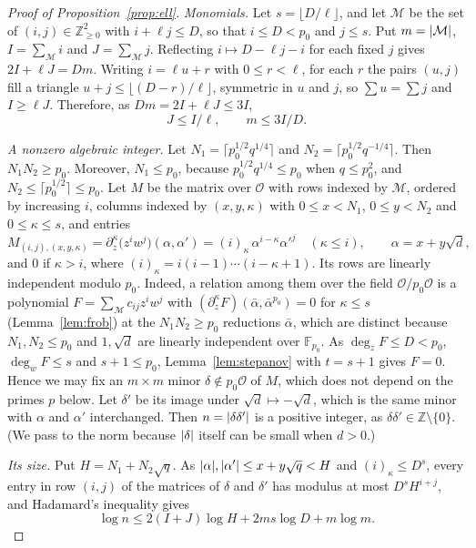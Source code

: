 \documentclass[11pt]{amsart}
\theoremstyle{remark}
\newcommand{\Z}{\mathbb{Z}}
\newcommand{\F}{\mathbb{F}}
\newcommand{\cO}{\mathcal{O}}
\newcommand{\cM}{\mathcal{M}}
\newcommand{\sd}{\sqrt{d}}
\DeclarePairedDelimiter\abs{\lvert}{\rvert}
\begin{document}
\begin{proof}[Proof of Proposition~\ref{prop:ell}]

\emph{Monomials.} Let $s=\lfloor D/\ell\rfloor$, and let $\cM$ be the set of $(i,j)\in\Z_{\ge0}^2$
with $i+\ell j\le D$, so that $i\le D<p_0$ and $j\le s$. Put $m=\abs{\cM}$, $I=\sum_\cM i$ and
$J=\sum_\cM j$. Reflecting $i\mapsto D-\ell j-i$ for each fixed $j$ gives $2I+\ell J=Dm$. Writing
$i=\ell u+r$ with $0\le r<\ell$, for each $r$ the pairs $(u,j)$ fill a triangle
$u+j\le\lfloor(D-r)/\ell\rfloor$, symmetric in $u$ and $j$, so $\sum u=\sum j$ and $I\ge\ell J$. Therefore, as
$Dm=2I+\ell J\le3I$,
\begin{equation}\label{eq:counts}
J\le I/\ell,\qquad m\le3I/D.
\end{equation}

\emph{A nonzero algebraic integer.} Let $N_1=\lceil p_0^{1/2}q^{1/4}\rceil$ and
$N_2=\lceil p_0^{1/2}q^{-1/4}\rceil$. Then $N_1N_2\ge p_0$. Moreover, $N_1\le p_0$, because
$p_0^{1/2}q^{1/4}\le p_0$ when $q\le p_0^2$, and $N_2\le\lceil p_0^{1/2}\rceil\le p_0$. Let $M$
be the matrix over $\cO$ with rows indexed by $\cM$, ordered by increasing $i$, columns indexed by
$(x,y,\kappa)$ with $0\le x<N_1$, $0\le y<N_2$ and $0\le\kappa\le s$, and entries
\[
M_{(i,j),(x,y,\kappa)}=\partial_z^\kappa\bigl(z^iw^j\bigr)(\alpha,\alpha')
=(i)_\kappa\,\alpha^{i-\kappa}\alpha'^{j}\quad(\kappa\le i),\qquad\alpha=x+y\sd,
\]
and $0$ if $\kappa>i$, where $(i)_\kappa=i(i-1)\cdots(i-\kappa+1)$. Its rows are linearly
independent modulo $p_0$. Indeed, a relation among them over the field $\cO/p_0\cO$ is a polynomial
$F=\sum_\cM c_{ij}z^iw^j$ with $(\partial_z^\kappa F)(\bar\alpha,\bar\alpha^{p_0})=0$ for
$\kappa\le s$ (Lemma~\ref{lem:frob}) at the $N_1N_2\ge p_0$ reductions $\bar\alpha$, which are
distinct because $N_1,N_2\le p_0$ and $1,\sd$ are linearly independent over $\F_{p_0}$. As
$\deg_zF\le D<p_0$, $\deg_wF\le s$ and $s+1\le p_0$, Lemma~\ref{lem:stepanov} with $t=s+1$ gives
$F=0$. Hence we may fix an $m\times m$ minor $\delta\notin p_0\cO$ of $M$, which does not depend on the
primes $p$ below. Let $\delta'$ be its image under $\sd\mapsto-\sd$, which is the same minor with
$\alpha$ and $\alpha'$ interchanged. Then $n=\abs{\delta\delta'}$ is a positive integer, as
$\delta\delta'\in\Z\setminus\{0\}$. (We pass to the norm because $\abs{\delta}$ itself can be small when $d>0$.)

\emph{Its size.} Put $H=N_1+N_2\sqrt q$. As $\abs{\alpha},\abs{\alpha'}\le x+y\sqrt q<H$ and
$(i)_\kappa\le D^s$, every entry in row $(i,j)$ of the matrices of $\delta$ and $\delta'$ has modulus
at most $D^sH^{i+j}$, and Hadamard's inequality gives
\begin{equation}\label{eq:upper}
\log n\le2(I+J)\log H+2ms\log D+m\log m.
\end{equation}


\end{proof}
\end{document}
